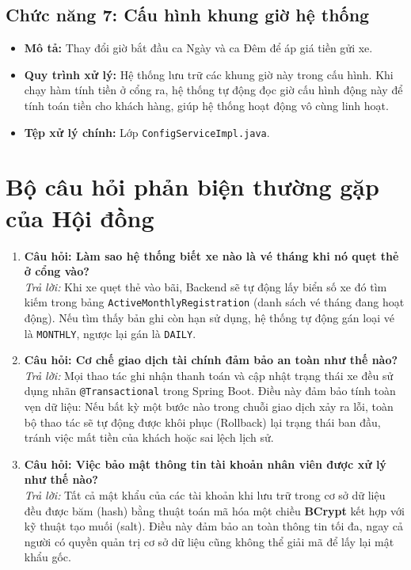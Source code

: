 \documentclass[12pt,a4paper]{article}
\begin{document}
\subsection{Chức năng 7: Cấu hình khung giờ hệ thống}
\begin{itemize}
    \item \textbf{Mô tả:} Thay đổi giờ bắt đầu ca Ngày và ca Đêm để áp giá tiền gửi xe.
    \item \textbf{Quy trình xử lý:} Hệ thống lưu trữ các khung giờ này trong cấu hình. Khi chạy hàm tính tiền ở cổng ra, hệ thống tự động đọc giờ cấu hình động này để tính toán tiền cho khách hàng, giúp hệ thống hoạt động vô cùng linh hoạt.
    \item \textbf{Tệp xử lý chính:} Lớp \texttt{ConfigServiceImpl.java}.
\end{itemize}

\section{Bộ câu hỏi phản biện thường gặp của Hội đồng}
\begin{enumerate}
    \item \textbf{Câu hỏi: Làm sao hệ thống biết xe nào là vé tháng khi nó quẹt thẻ ở cổng vào?}
    \\ \textit{Trả lời:} Khi xe quẹt thẻ vào bãi, Backend sẽ tự động lấy biển số xe đó tìm kiếm trong bảng \texttt{ActiveMonthlyRegistration} (danh sách vé tháng đang hoạt động). Nếu tìm thấy bản ghi còn hạn sử dụng, hệ thống tự động gán loại vé là \texttt{MONTHLY}, ngược lại gán là \texttt{DAILY}.
    
    \item \textbf{Câu hỏi: Cơ chế giao dịch tài chính đảm bảo an toàn như thế nào?}
    \\ \textit{Trả lời:} Mọi thao tác ghi nhận thanh toán và cập nhật trạng thái xe đều sử dụng nhãn \texttt{@Transactional} trong Spring Boot. Điều này đảm bảo tính toàn vẹn dữ liệu: Nếu bất kỳ một bước nào trong chuỗi giao dịch xảy ra lỗi, toàn bộ thao tác sẽ tự động được khôi phục (Rollback) lại trạng thái ban đầu, tránh việc mất tiền của khách hoặc sai lệch lịch sử.
    
    \item \textbf{Câu hỏi: Việc bảo mật thông tin tài khoản nhân viên được xử lý như thế nào?}
    \\ \textit{Trả lời:} Tất cả mật khẩu của các tài khoản khi lưu trữ trong cơ sở dữ liệu đều được băm (hash) bằng thuật toán mã hóa một chiều \textbf{BCrypt} kết hợp với kỹ thuật tạo muối (salt). Điều này đảm bảo an toàn thông tin tối đa, ngay cả người có quyền quản trị cơ sở dữ liệu cũng không thể giải mã để lấy lại mật khẩu gốc.
\end{enumerate}
\end{document}
